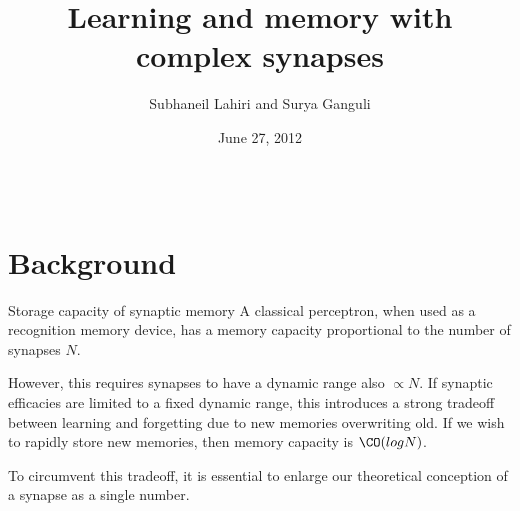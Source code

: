 \documentclass[final,hyperref={pdfpagelabels=false,bookmarks=false}]{beamer}
\title{Learning and memory with complex synapses}
\author{Subhaneil Lahiri and Surya Ganguli}
\institute[Stanford]{%
Department of Applied Physics, Stanford University, Stanford CA
}
\date{June 27, 2012}
\newcommand{\citerr}[1]{\hfill {\footnotesize{\color{darkgrey}\cite{#1}}}}
\begin{document}
\begin{frame}{}

\begin{columns}[t]


\begin{column}{0.27\linewidth}

\section{Background}


\begin{block}{Storage capacity of synaptic memory}
%
%
 A classical perceptron, when used as a recognition memory device, has a memory capacity proportional to the number of synapses $N$.

 \vp However, this requires synapses to have a dynamic range also $\propto N$.
 If synaptic efficacies are limited to a fixed dynamic range, this introduces a strong tradeoff between learning and forgetting due to new memories overwriting old.
 If we wish to rapidly store new memories, then memory capacity is $ \CO(log N)$.
 \\ \citerr{amit1992constraints,amit1994learning}

 \vp To circumvent this tradeoff, it is essential to enlarge our theoretical conception of a synapse as a single number.
\end{block}



\end{column}
\end{columns}
\end{frame}
\end{document}
